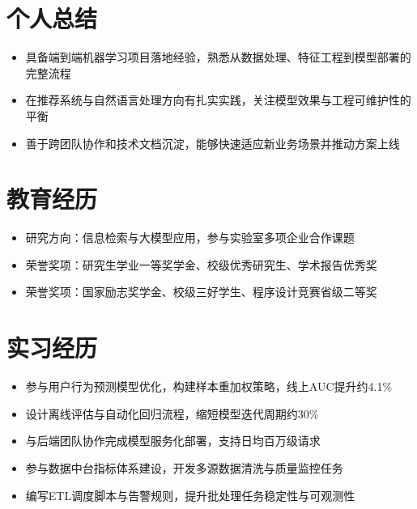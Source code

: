

\section{个人总结}
\begin{itemize}
  \item 具备端到端机器学习项目落地经验，熟悉从数据处理、特征工程到模型部署的完整流程
  \item 在推荐系统与自然语言处理方向有扎实实践，关注模型效果与工程可维护性的平衡
  \item 善于跨团队协作和技术文档沉淀，能够快速适应新业务场景并推动方案上线
\end{itemize}


\section{教育经历}


\begin{itemize}
  \item 研究方向：信息检索与大模型应用，参与实验室多项企业合作课题
  \item 荣誉奖项：研究生学业一等奖学金、校级优秀研究生、学术报告优秀奖
\end{itemize}



\begin{itemize}
  \item 荣誉奖项：国家励志奖学金、校级三好学生、程序设计竞赛省级二等奖
\end{itemize}


\section{实习经历}

\begin{itemize}
  \item 参与用户行为预测模型优化，构建样本重加权策略，线上AUC提升约4.1\%
  \item 设计离线评估与自动化回归流程，缩短模型迭代周期约30\%
  \item 与后端团队协作完成模型服务化部署，支持日均百万级请求
\end{itemize}


\begin{itemize}
  \item 参与数据中台指标体系建设，开发多源数据清洗与质量监控任务
  \item 编写ETL调度脚本与告警规则，提升批处理任务稳定性与可观测性
\end{itemize}


